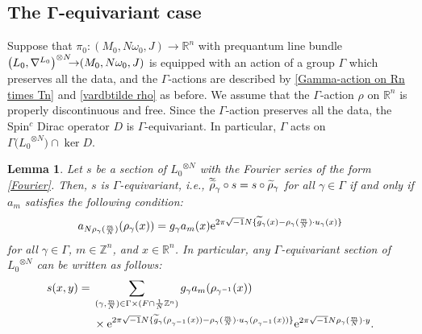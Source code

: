 \documentclass[pdftex]{sigma}
\numberwithin{equation}{section}
\newtheorem{Lemma}[Theorem]{Lemma}
\newcommand{\R}{\mathbb{R}}
\newcommand{\Z}{\mathbb{Z}}
\renewcommand{\tilde}{\widetilde}
\newcommand{\vardbtilde}[1]{\tilde{\raisebox{0pt}[0.85\height]{$\tilde{#1}$}}}
\begin{document}
\subsection[The Gamma-equivariant case]{The $\boldsymbol{\Gamma}$-equivariant case}
Suppose that $\pi_0\colon (M_0,N\omega_0,J)\to \R^n$ with prequantum line bundle $\bigl({L_0}, \nabla^{L_0}\bigr)^{\otimes N}{\hspace*{-1mm}\to} (M_0,N\omega_0,J)$ is equipped with an action of a group $\Gamma$ which preserves all the data, and the $\Gamma$-actions are described by \eqref{Gamma-action on Rn times Tn} and \eqref{vardbtilde rho} as before. We assume that the $\Gamma$-action $\rho$ on $\R^n$ is properly discontinuous and free.
Since the $\Gamma$-action preserves all the data, the Spin${}^c$ Dirac operator $D$ is $\Gamma$-equivariant. In particular, $\Gamma$ acts on $\Gamma \bigl({L_0}^{\otimes N}\bigr)\cap \ker D$.%
\begin{Lemma}\label{Gamma-invariance-lemma}
Let $s$ be a section of ${L_0}^{\otimes N}$ with the Fourier series of the form \eqref{Fourier}.
Then, $s$ is $\Gamma$-equivariant, i.e., ${\vardbtilde \rho}_\gamma\circ s=s\circ {\tilde \rho}_\gamma$ for all $\gamma\in \Gamma$ if and only if $a_m$ satisfies the following condition:
\begin{gather}\label{Gamma-invariance}
a_{N\rho_\gamma(\frac{m}{N})}(\rho_\gamma (x))=g_\gamma a_m(x){\rm e}^{2\pi\sqrt{-1}N\{ {\tilde g}_\gamma(x)
-\rho_\gamma(\frac{m}{N})\cdot u_\gamma (x)\}}
\end{gather}
for all $\gamma \in \Gamma$, $m\in \Z^n$, and $x\in \R^n$. In particular, any $\Gamma$-equivariant section of ${L_0}^{\otimes N}$ can be written as follows:
\begin{align}
s(x,y)={}&\sum_{(\gamma ,\frac{m}{N})\in \Gamma \times (F\cap \frac{1}{N}\Z^n)}g_{\gamma}a_m(\rho_{\gamma^{-1}}(x))\nonumber\\
&\times{\rm e}^{2\pi\sqrt{-1}N\{{\tilde g}_\gamma (\rho_{\gamma^{-1}}(x))-\rho_{\gamma}(\frac{m}{N})\cdot u_{\gamma}(\rho_{\gamma^{-1}}(x))\}}{\rm e}^{2\pi\sqrt{-1}N\rho_{\gamma}(\frac{m}{N})\cdot y}.\label{Gamma-equiv section}
\end{align}
\end{Lemma}
\end{document}
